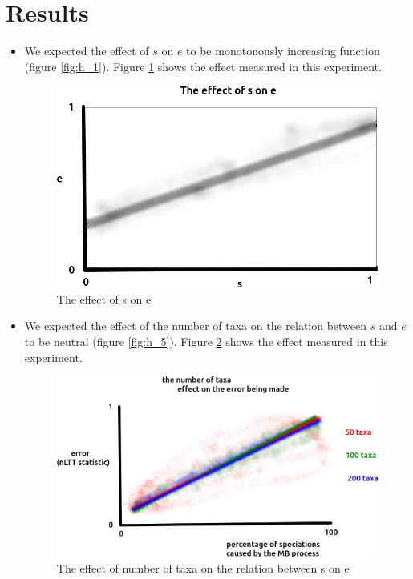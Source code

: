 \documentclass{article}
\begin{document}
\section{Results}
\begin{itemize}

\item We expected the effect of $s$ on $e$ to be monotonously increasing
function (figure \ref{fig:h_1}). Figure \ref{fig:1} shows the effect 
measured in this experiment. 

\begin{figure}[!htbp]
  \includegraphics[width=\textwidth]{fig_1.png}
  \caption{
    The effect of s on e
  }
  \label{fig:1}
\end{figure}

\item We expected the effect of the number of taxa on the relation
between $s$ and $e$ to be neutral (figure \ref{fig:h_5}). 
Figure \ref{fig:5} shows the effect 
measured in this experiment. 

\begin{figure}[!htbp]
  \includegraphics[width=\textwidth]{fig_5.png}
  \caption{
    The effect of number of taxa on the relation between s on e
  }
  \label{fig:5}
\end{figure}


\end{itemize}
\end{document}
